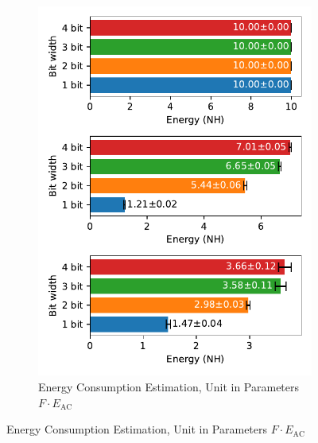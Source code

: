         \begin{figure}[H]
            \centering
            \begin{subfigure}[H]{0.7\textwidth}
                \centering
                \includegraphics[width=\textwidth]{../standard/CIFAR10/plots/cifar10_test_energy_nh.pdf}
                \caption{Energy Consumption Estimation, Unit in Parameters $F\cdot E_{\text{AC}}$}
            \end{subfigure}
        \end{figure}
